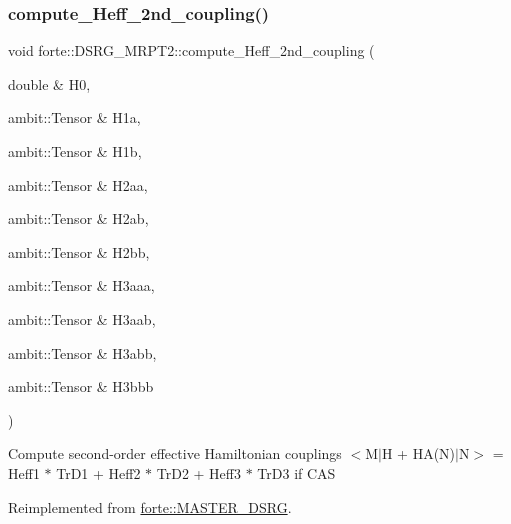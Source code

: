\mbox{\label{classforte_1_1_d_s_r_g___m_r_p_t2_a739972fe0720c3a9881c1bd039fedb11}} 
\subsubsection{\texorpdfstring{compute\+\_\+\+Heff\+\_\+2nd\+\_\+coupling()}{compute\_Heff\_2nd\_coupling()}}
{\footnotesize\ttfamily void forte\+::\+D\+S\+R\+G\+\_\+\+M\+R\+P\+T2\+::compute\+\_\+\+Heff\+\_\+2nd\+\_\+coupling (\begin{DoxyParamCaption}\item[{double \&}]{H0,  }\item[{ambit\+::\+Tensor \&}]{H1a,  }\item[{ambit\+::\+Tensor \&}]{H1b,  }\item[{ambit\+::\+Tensor \&}]{H2aa,  }\item[{ambit\+::\+Tensor \&}]{H2ab,  }\item[{ambit\+::\+Tensor \&}]{H2bb,  }\item[{ambit\+::\+Tensor \&}]{H3aaa,  }\item[{ambit\+::\+Tensor \&}]{H3aab,  }\item[{ambit\+::\+Tensor \&}]{H3abb,  }\item[{ambit\+::\+Tensor \&}]{H3bbb }\end{DoxyParamCaption})\hspace{0.3cm}{\ttfamily [virtual]}}

Compute second-\/order effective Hamiltonian couplings $<$M$\vert$H + H\+A(\+N)$\vert$N$>$ = Heff1 $\ast$ Tr\+D1 + Heff2 $\ast$ Tr\+D2 + Heff3 $\ast$ Tr\+D3 if C\+AS 

Reimplemented from \mbox{\hyperlink{classforte_1_1_m_a_s_t_e_r___d_s_r_g_ae4f6a58d88aa03439d4c12e56fe90e0b}{forte\+::\+M\+A\+S\+T\+E\+R\+\_\+\+D\+S\+RG}}.

\mbox{\label{classforte_1_1_d_s_r_g___m_r_p_t2_ab26d66a2079561ba8c7f591eb3fa93da}} 
